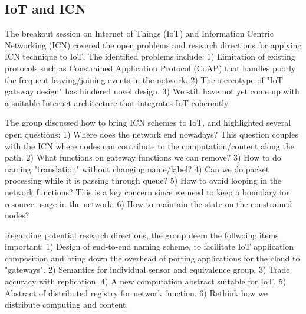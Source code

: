 \subsection{IoT and ICN}

The breakout session on Internet of Things (IoT) and Information Centric
Networking (ICN) covered the open problems and research directions for
applying ICN technique to IoT. The identified problems include: 1) Limitation
of existing protocols such as Constrained Application Protocol (CoAP) that
handles poorly the frequent leaving/joining events in the network. 2) The
stereotype of "IoT gateway design" has hindered novel design. 3) We still
have not yet come up with a suitable Internet architecture that integrates
IoT coherently.

The group discussed how to bring ICN schemes to IoT, and highlighted several
open questions: 1) Where does the network end nowadays? This question couples
with the ICN where nodes can contribute to the computation/content along
the path. 2) What functions on gateway functions we can remove? 3) How to do
naming "translation" without changing name/label? 4) Can we do packet
processing while it is passing through queue? 5) How to avoid looping in
the network functions? This is a key concern since we need to keep a
boundary for resource usage in the network. 6) How to maintain the state on
the constrained nodes?

Regarding potential research directions, the group deem the follwoing items
important: 1) Design of end-to-end naming scheme, to facilitate IoT
application composition and bring down the overhead of porting applications
for the cloud to "gateways". 2) Semantics for individual sensor and
equivalence group. 3) Trade accuracy with replication. 4) A new computation
abstract suitable for IoT. 5) Abstract of distributed registry for network
function. 6) Rethink how we distribute computing and content.

